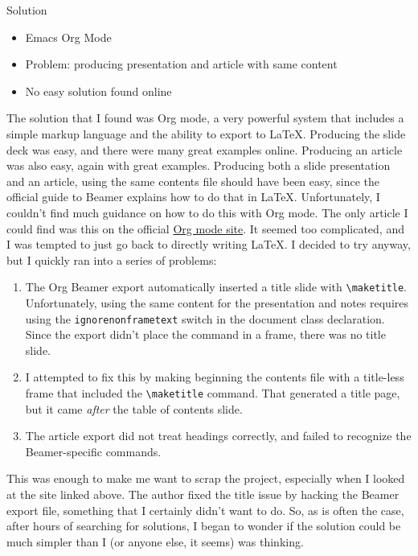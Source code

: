 \documentclass[aspectratio=169,12pt,ignorenonframetext]{beamer}
\begin{document}
\begin{frame}[label={sec:org614d4f8}]{Solution}
\begin{itemize}
\item Emacs Org Mode
\item Problem: producing presentation and article with same content
\item No easy solution found online
\end{itemize}
\end{frame}
The solution that I found was Org mode, a very powerful system that includes a simple markup language and the ability to export to \LaTeX. Producing the slide deck was easy, and there were many great examples online. Producing an article was also easy, again with great examples. Producing both a slide presentation and an article, using the same contents file should have been easy, since the official guide to Beamer explains how to do that in \LaTeX. Unfortunately, I couldn't find much guidance on how to do this with Org mode. The only article I could find was this on the official \href{https://orgmode.org/worg/exporters/beamer/beamer-dual-format.html}{Org mode site}. It seemed too complicated, and I was tempted to just go back to directly writing \LaTeX. I decided to try anyway, but I quickly ran into a series of problems:

\begin{enumerate}
\item The Org Beamer export automatically inserted a title slide with \texttt{\textbackslash{}maketitle}. Unfortunately, using the same content for the presentation and notes requires using the \texttt{ignorenonframetext} switch in the document class declaration. Since the export didn't place the command in a frame, there was no title slide.
\item I attempted to fix this by making beginning the contents file with a title-less frame that included the \texttt{\textbackslash{}maketitle} command. That generated a title page, but it came \emph{after} the table of contents slide.
\item The article export did not treat headings correctly, and failed to recognize the Beamer-specific commands.
\end{enumerate}

This was enough to make me want to scrap the project, especially when I looked at the site linked above. The author fixed the title issue by hacking the Beamer export file, something that I certainly didn't want to do. So, as is often the case, after hours of searching for solutions, I began to wonder if the solution could be much simpler than I (or anyone else, it seems) was thinking.
\end{document}
